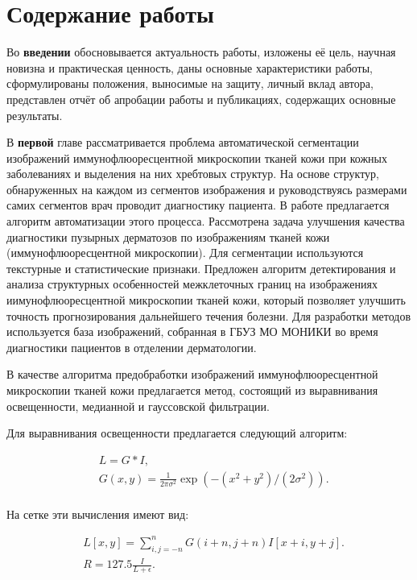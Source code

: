 \section*{Содержание работы}

Во {\textbf{введении}} обосновывается актуальность работы, изложены её цель, научная новизна и практическая ценность, даны основные характеристики работы, сформулированы положения, выносимые на защиту, личный вклад автора, представлен отчёт об апробации работы и публикациях, содержащих основные результаты.

В {\textbf{первой}} главе рассматривается проблема автоматической сегментации изображений иммунофлюоресцентной микроскопии тканей кожи при кожных заболеваниях и выделения на них хребтовых структур. На основе структур, обнаруженных на каждом из сегментов изображения и руководствуясь размерами самих сегментов врач проводит диагностику пациента. В работе предлагается алгоритм автоматизации этого процесса. Рассмотрена задача улучшения качества диагностики пузырных дерматозов по изображениям тканей кожи (иммунофлюоресцентной микроскопии).  Для сегментации используются текстурные и статистические признаки. Предложен алгоритм детектирования и анализа структурных особенностей межклеточных границ на изображениях иимунофлюоресцентной микроскопии тканей кожи, который позволяет улучшить точность прогнозирования дальнейшего течения болезни. Для разработки методов используется база изображений, собранная в ГБУЗ МО МОНИКИ во время диагностики пациентов в отделении дерматологии.

В качестве алгоритма предобработки изображений иммунофлюоресцентной микроскопии тканей кожи предлагается метод, состоящий из выравнивания освещенности, медианной и гауссовской фильтрации.

Для выравнивания освещенности предлагается следующий алгоритм:

\begin{equation}
\begin{split}
 & L = G * I,\\
 &  G(x,y)=\frac{1}{2\pi{\sigma^2}}\exp{(-(x^2+ y^2 )/(2\sigma^2 ))}.\\
\end{split}
\end{equation}

 \noindent На сетке эти вычисления имеют вид:  
 
 \begin{equation}
\begin{split}
 & L[x,y]= \sum_{i,j=-n}^{n}G(i + n, j + n)I[x + i, y + j].\\
 & R=127.5\frac{I}{L + \epsilon}.\\
\end{split}
\end{equation} 


